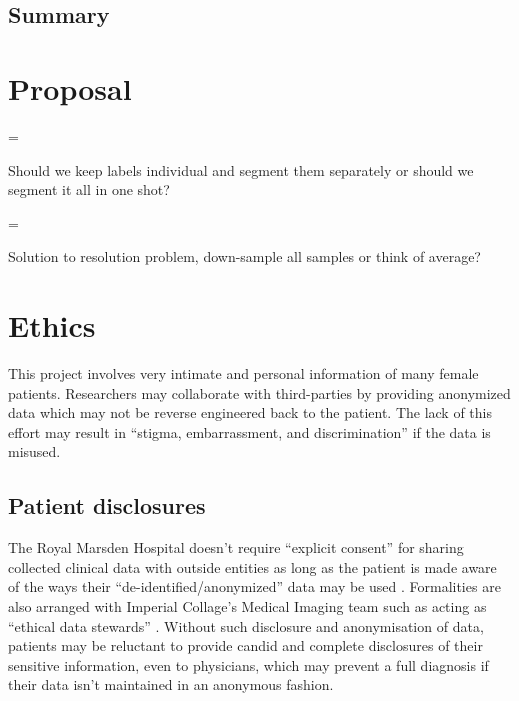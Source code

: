 \documentclass[11pt,twoside]{report}
\newenvironment{warning}
  {\par\begin{mdframed}[linewidth=1pt,linecolor=black]%
    \begin{list}{}{\leftmargin=1cm
                   \labelwidth=\leftmargin}\item[\Large\ding{43}]}
  {\end{list}\end{mdframed}\par}
\begin{document}
\section{Summary}\label{sect:results-summary}

\chapter{Proposal}\label{sect:proposal}

\begin{warning}
  Should we keep labels individual and segment them separately or should we segment it all in one shot?
\end{warning}

\begin{warning}
  Solution to resolution problem, down-sample all samples or think of average?
\end{warning}

\chapter{Ethics}\label{sect:ethics}

This project involves very intimate and personal information of many female patients. Researchers may collaborate with third-parties by providing anonymized data which may not be reverse engineered back to the patient.
The lack of this effort may result in ``stigma, embarrassment, and discrimination'' \cite{health-privacy} if the data is misused.

\section{Patient disclosures}\label{sect:patient-disclosures}

The Royal Marsden Hospital doesn't require ``explicit consent'' for sharing collected clinical data with outside entities as long as the patient is made aware of the ways their ``de-identified/anonymized'' data may be used  \cite{royal-marsden-privacy-note}. Formalities are also arranged with Imperial Collage's Medical Imaging team such as acting as ``ethical data stewards'' \cite{ethics-imaging-AI}. Without such disclosure and anonymisation of data, patients may be reluctant to provide candid and complete disclosures of their sensitive information, even to physicians, which may prevent a full diagnosis if their data isn't maintained in an anonymous fashion.
\end{document}
